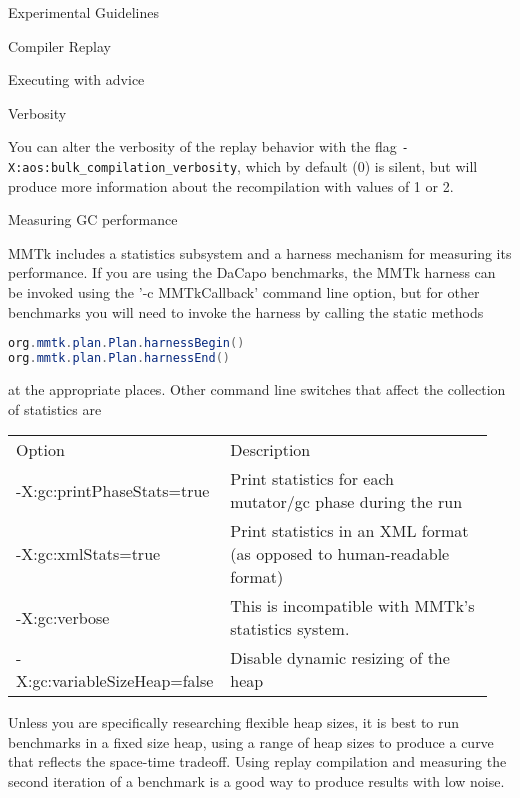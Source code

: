 \begin{chapter}{Experimental Guidelines}
\begin{section}{Compiler Replay}
\begin{subsection}{Executing with advice}
\end{subsection}

\begin{subsection}{Verbosity}

You can alter the verbosity of the replay behavior with the flag \texttt{-X:aos:bulk\_compilation\_verbosity}, which by default (0) is silent, but will produce more information about the recompilation with values of 1 or 2. 

\end{subsection}

\end{section}

\begin{section}{Measuring GC performance}

MMTk includes a statistics subsystem and a harness mechanism for measuring its performance.  If you are using the DaCapo benchmarks, the MMTk harness can be invoked using the '-c MMTkCallback' command line option, but for other benchmarks you will need to invoke the harness by calling the static methods

\begin{lstlisting}[language=Java]
org.mmtk.plan.Plan.harnessBegin()
org.mmtk.plan.Plan.harnessEnd()
\end{lstlisting}

at the appropriate places.  Other command line switches that affect the collection of statistics are

\begin{table}[h]
\centering
\begin{tabular}{p{0.4\linewidth}p{0.55\linewidth}}
Option & Description \\
-X:gc:printPhaseStats=true & Print statistics for each mutator/gc phase during the run \\
-X:gc:xmlStats=true & Print statistics in an XML format (as opposed to human-readable format) \\
-X:gc:verbose & This is incompatible with MMTk's statistics system. \\
-X:gc:variableSizeHeap=false & Disable dynamic resizing of the heap \\
\end{tabular}
\end{table}


Unless you are specifically researching flexible heap sizes, it is best to run benchmarks in a fixed size heap, using a range of heap sizes to produce a curve that reflects the space-time tradeoff.  Using replay compilation and measuring the second iteration of a benchmark is a good way to produce results with low noise.


\end{section}
\end{chapter}
